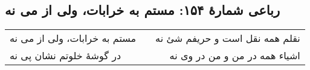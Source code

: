 \begin{center}
\section*{رباعی شمارهٔ ۱۵۴: مستم به خرابات، ولی از می نه}
\label{sec:154}
\begin{longtable}{l p{0.5cm} r}
مستم به خرابات، ولی از می نه
&&
نقلم همه نقل است و حریفم شئ نه
\\
در گوشهٔ خلوتم نشان پی نه
&&
اشیاء همه در من و من در وی نه
\\
\end{longtable}
\end{center}
